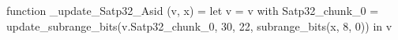function _update_Satp32_Asid (v, x) = let v = { v with Satp32_chunk_0 = update_subrange_bits(v.Satp32_chunk_0, 30, 22, subrange_bits(x, 8, 0)) } in
  v
